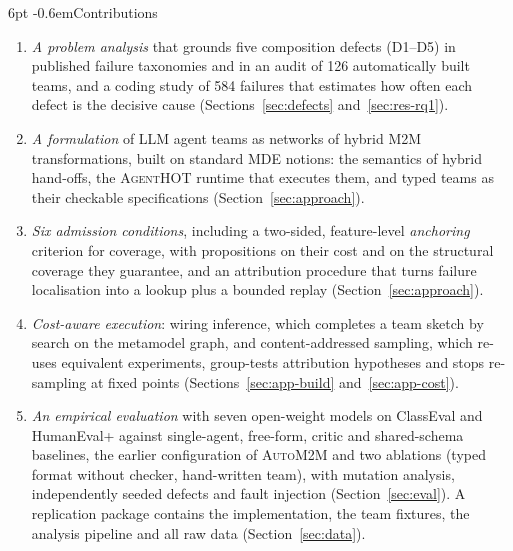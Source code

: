 \documentclass[pdflatex,sn-mathphys-num]{sn-jnl}
\makeatletter
\theoremstyle{thmstyleone}%
\theoremstyle{thmstyletwo}%
\theoremstyle{thmstylethree}%
\newcommand{\tool}{\textsc{AgentHOT}}
\newcommand{\auto}{\textsc{AutoM2M}}
\newcommand{\D}[1]{\textsf{D#1}}
\renewcommand\paragraph{\@startsection{paragraph}{4}{\z@}%
  {6pt \@plus 2pt \@minus 1pt}{-0.6em}{\normalfont\normalsize\bfseries}}
\makeatother
\begin{document}
\paragraph{Contributions}
\begin{enumerate}[label=\textbf{C\arabic*}, leftmargin=2.2em, itemsep=1pt]
\item \emph{A problem analysis} that grounds five composition defects
(\D{1}--\D{5}) in published failure taxonomies and in an audit of 126
automatically built teams, and a coding study of 584 failures that estimates
how often each defect is the decisive cause (Sections~\ref{sec:defects}
and~\ref{sec:res-rq1}).
\item \emph{A formulation} of LLM agent teams as networks of hybrid M2M
transformations, built on standard MDE notions: the semantics of hybrid
hand-offs, the \tool{} runtime that executes them, and typed teams as their
checkable specifications (Section~\ref{sec:approach}).
\item \emph{Six admission conditions}, including a two-sided, feature-level
\emph{anchoring} criterion for coverage, with propositions on their cost and on
the structural coverage they guarantee, and an attribution procedure that turns
failure localisation into a lookup plus a bounded replay
(Section~\ref{sec:approach}).
\item \emph{Cost-aware execution}: wiring inference, which completes a team
sketch by search on the metamodel graph, and content-addressed sampling, which
re-uses equivalent experiments, group-tests attribution hypotheses and stops
re-sampling at fixed points (Sections~\ref{sec:app-build}
and~\ref{sec:app-cost}).
\item \emph{An empirical evaluation} with seven open-weight models on ClassEval
and HumanEval+ against single-agent, free-form, critic and shared-schema
baselines, the earlier configuration of \auto{} and two ablations (typed format
without checker, hand-written team), with mutation analysis, independently
seeded defects and fault injection (Section~\ref{sec:eval}). A replication
package contains the implementation, the team fixtures, the analysis pipeline
and all raw data (Section~\ref{sec:data}).
\end{enumerate}
\end{document}
